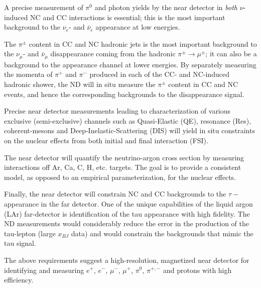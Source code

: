 A precise measurement of $\pi^0$ and photon yields by the near
detector in \textit{both} $\nu$-induced NC and CC interactions is
essential; this is the most important background to the $\nu_e$- and
$\bar \nu_e$ appearance at low energies.



The $\pi^{\pm}$ content in CC and NC hadronic jets is the most important background to 
the $\nu_\mu$- and $\bar \nu_\mu$ disappearance coming from the hadronic   $\pi^{\pm} \rightarrow \mu^{\pm}$; 
it can also be a background to the appearance channel at lower energies. 
By separately measuring the momenta of $\pi^+$ and $\pi^-$ produced in each of 
the CC- and NC-induced hadronic shower, the ND 
will in situ measure the $\pi^{\pm}$ content in CC and NC events, and hence the corresponding backgrounds 
to the disappearance signal. 



Precise near detector measurements leading to characterization of 
 various exclusive (semi-exclusive) 
channels such as Quasi-Elastic (QE), resonance (Res), 
coherent-mesons and Deep-Inelastic-Scattering (DIS)
will yield in situ constraints on the nuclear effects from both
initial and final interaction (FSI).


The near detector will quantify the neutrino-argon cross section by
measuring interactions off Ar, Ca, C, H, etc. targets. The goal is to
provide a consistent model, as opposed to an empirical
parameterization, for the nuclear effects.


Finally, the near detector will constrain NC and CC backgrounds to the
$\tau-$ appearance in the far detector.  %
One of the
unique capabilities of the liquid argon (LAr) far-detector is 
identification of the tau appearance with high fidelity. The ND measurements
would considerably reduce the error in the production of the
tau-lepton (large $x_{BJ}$ data) and would constrain the backgrounds
that mimic the tau signal.

The above requirements suggest a high-resolution, magnetized near
detector for identifying and measuring $e^+$, $e^-$, $\mu^-$, $\mu^+$,
$\pi^0$, $\pi^{+,-}$ and protons with high efficiency.



